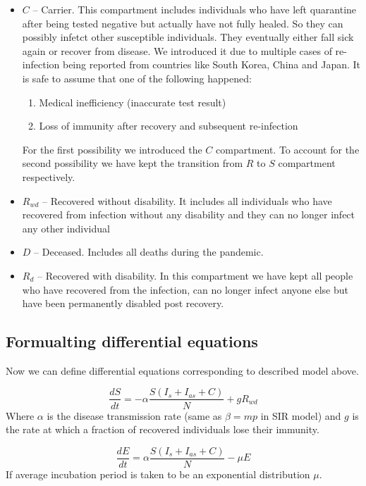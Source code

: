 \documentclass[12pt, a4paper]{article}
\begin{document}
\begin{itemize}
		\item \textbf{$C$} -- Carrier. This compartment includes individuals who have left quarantine after being tested negative but actually have not fully healed. So they can possibly infetct other susceptible individuals. They eventually either fall sick again or recover from disease. We introduced it due to multiple cases of re-infection being reported from countries like South Korea, China and Japan. It is safe to assume that one of the following happened:
		\begin{enumerate}
			\item Medical inefficiency (inaccurate test result)
			\item Loss of immunity after recovery and subsequent re-infection
		\end{enumerate}
		For the first possibility we introduced the $C$ compartment. To account for the second possibility we have kept the transition from $R$ to $S$ compartment respectively.
		\item $R_{wd}$ -- Recovered without disability. It includes all individuals who have recovered from infection without any disability and they can no longer infect any other individual
		\item $D$ -- Deceased. Includes all deaths during the pandemic.
		\item $R_d$ -- Recovered with disability. In this compartment we have kept all people who have recovered from the infection, can no longer infect anyone else but have been permanently disabled post recovery.
	\end{itemize}
	 
	\newpage

	\subsection{Formualting differential equations}

	Now we can define differential equations corresponding to described model above.

	\begin{equation}
		\frac{dS}{dt} = -\alpha \frac{S(I_s + I_{as} + C)}{N} + g R_{wd}
	\end{equation}
	Where $\alpha$ is the disease transmission rate (same as $\beta = mp$ in SIR model) and $g$ is the rate at which a fraction of recovered individuals lose their immunity.

	\begin{equation}
		\frac{dE}{dt} = \alpha \frac{S(I_s + I_{as} + C)}{N} - \mu E
	\end{equation}
	If average incubation period is taken to be an exponential distribution $\mu$.
\end{document}
